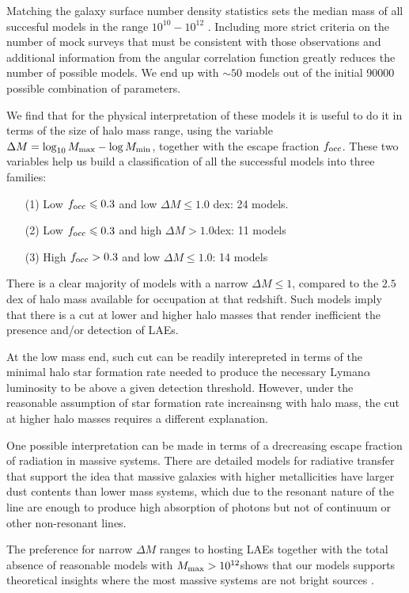 \documentclass[usenatbib]{mn2e}
\newcommand{\ly}{{\ifmmode{{\rm Ly}\alpha}\else{Ly$\alpha$~}\fi}}
\newcommand{\hMsun}{{\ifmmode{h^{-1}{\rm
        {M_{\odot}}}}\else{$h^{-1}{\rm{M_{\odot}}}$}\fi}}
\newcommand{\lya}{{Lyman$\alpha$~}}
\begin{document}
Matching the galaxy surface number density statistics sets the median
mass of all succesful models in the range $10^{10}-10^{12}$
\hMsun. Including more strict criteria on the number of mock surveys
that must be consistent with those observations and additional
information from the angular correlation function greatly reduces the
number of possible models. We end up with $\sim 50$ models out of the
initial 90000 possible combination of parameters.  

We find that for the physical interpretation of these models it is
useful to do it in terms of the size of halo mass range, using the
variable $\Delta M=\log_{10}M_{\rm max} - \log M_{\rm  min}$, together
with the escape fraction $f_{\rm occ}$. These two variables help us
build a classification of all the successful models into three families:


\begin{itemize}
\item[(1)] Low $f_{\rm occ}\leq 0.3$ and low $\Delta M\leq 1.0$
  dex: 24 models.
\item[(2)] Low $f_{\rm occ}\leq 0.3$ and high $\Delta M > 1.0$dex: 11
  models
\item[(3)] High $f_{\rm occ}> 0.3$ and low $\Delta M\leq 1.0$: 14 models
\end{itemize}

There is a clear majority of models with a narrow $\Delta M\leq
1$, compared to the $2.5$dex of halo mass available for occupation at
that redshift. Such models imply that there is a cut at lower and higher halo
masses that render inefficient the presence and/or detection of LAEs.

At the low mass end, such cut can be readily interepreted in terms of the
minimal halo star formation rate needed to produce the necessary \lya
luminosity to be above a given detection threshold.  However, under
the reasonable assumption of star formation rate increainsng with halo
mass, the cut at higher halo masses requires a different explanation. 

One possible interpretation can be made in terms of a drecreasing escape
fraction of \ly radiation in massive systems. There are detailed models for
radiative transfer that support the idea that massive galaxies with
higher metallicities have larger dust contents than lower mass
systems, which due to the resonant nature of the \ly line are enough
to produce high absorption of \ly photons but not of continuum or
other non-resonant lines.  

The preference for narrow $\Delta M$ ranges to hosting LAEs together
with the total absence of reasonable models with $M_{\rm max}>
10^{12}$\hMsun shows that our models supports theoretical insights
where the most massive systems are not bright \ly sources
\citep{ForeroRomero2012}.   
\end{document}
